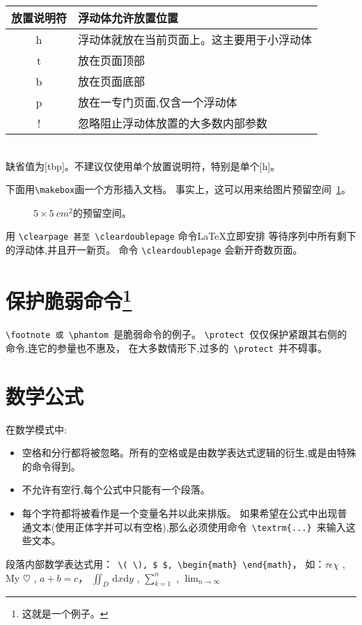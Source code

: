 \documentclass[12pt, a4paper, onecolumn, notitlepage]{article}
\begin{document}
\begin{tabular}{c l}
放置说明符 & 浮动体允许放置位置 \\
\hline
h & 浮动体就放在当前页面上。这主要用于小浮动体 \\
t & 放在页面顶部 \\
b & 放在页面底部 \\
p & 放在一专门页面,仅含一个浮动体 \\
! & 忽略阻止浮动体放置的大多数内部参数 \\
\end{tabular}\\
缺省值为[tbp]。不建议仅使用单个放置说明符，特别是单个[h]。

下面用\verb+\makebox+画一个方形插入文档。
事实上，这可以用来给图片预留空间~{\ref{white-figure}}。
\begin{figure}[!hbp]
\makebox[\textwidth]{\framebox[5cm]{\rule{0pt}{5cm}}}
\caption[浮动体]{ $5\times 5\ cm^2$的预留空间。} \label{white-figure}
\end{figure}
用 \verb+\clearpage 甚至 \cleardoublepage+ 命令\LaTeX 立即安排
等待序列中所有剩下的浮动体,并且开一新页。
命令 \verb-\cleardoublepage- 会新开奇数页面。
\section{保护脆弱命令\protect\footnote{这就是一个例子。}}
\verb+\footnote 或 \phantom +是脆弱命令的例子。
\verb-\protect -仅仅保护紧跟其右侧的命令,连它的参量也不惠及，
在大多数情形下,过多的\verb- \protect -并不碍事。
\section{数学公式}
在数学模式中:
\begin{itemize}
 \item[1.]空格和分行都将被忽略。所有的空格或是由数学表达式逻辑的衍生,或是由特殊的命令得到。
 \item[2.]不允许有空行,每个公式中只能有一个段落。
 \item[3.]每个字符都将被看作是一个变量名并以此来排版。
如果希望在公式中出现普通文本(使用正体字并可以有空格),那么必须使用命令\verb- \textrm{...} -来输入这些文本。
\end{itemize}

段落内部数学表达式用：\verb+ \( \), $ $, \begin{math} \end{math}+，
如：\(\tau\epsilon\chi\) , My $\heartsuit$ , \begin{math}a+b=c\end{math}，
$\iint_{D}\,\mathrm{d}x\mathrm{d}y$ , $\sum_{k=1}^n$ , $\lim_{n \to \infty}$
\end{document}
